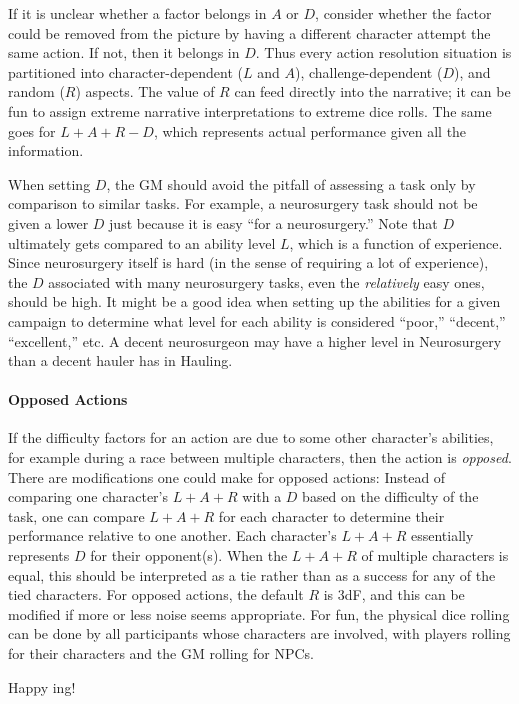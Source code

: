 If it is unclear whether a factor belongs in $A$ or $D$, consider whether the factor could be removed from the picture by having a different character attempt the same action. If not, then it belongs in $D$.
Thus every action resolution situation is partitioned into
character-dependent ($L$ and $A$), challenge-dependent ($D$), and random ($R$) aspects.
The value of $R$ can feed directly into the narrative; it can be fun to assign extreme narrative interpretations to extreme dice rolls.
The same goes for $L + A + R - D$, which represents actual performance given all the information.


When setting $D$, the GM should avoid the pitfall of assessing a task only by comparison to similar tasks.
For example, a neurosurgery task should not be given a lower $D$ just because it is easy ``for a neurosurgery.''
Note that $D$ ultimately gets compared to an ability level $L$, which is a function of experience.
Since neurosurgery itself is hard (in the sense of requiring a lot of experience), the $D$ associated with many neurosurgery tasks, even the \emph{relatively} easy ones, should be high.
It might be a good idea when setting up the abilities for a given campaign to determine what level for each ability is considered ``poor,'' ``decent,'' ``excellent,'' etc.
A decent neurosurgeon may have a higher level in Neurosurgery than a decent hauler has in Hauling.

\paragraph{Opposed Actions}
If the difficulty factors for an action are due to some other character's abilities,
for example during a race between multiple characters,
then the action is \emph{opposed}.
There are modifications one could make for opposed actions: Instead of comparing one character’s $L + A + R$ with a $D$ based on the difficulty of the task,
one can compare $L + A + R$ for each character to determine their performance relative to one another.
Each character's $L + A + R$ essentially represents $D$ for their opponent(s).
When the $L + A + R$ of multiple characters is equal,
this should be interpreted as a tie rather than as a success for any of the tied characters.
For opposed actions,
the default $R$ is $3$dF,
and this can be modified if more or less noise seems appropriate.
For fun,
the physical dice rolling can be done by all participants whose characters are involved,
with players rolling for their characters and the GM rolling for NPCs.

Happy \peupfudge{}ing!

